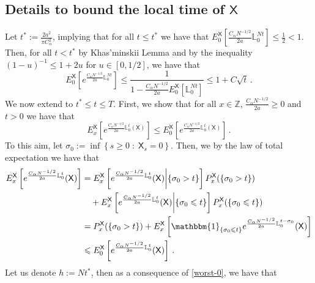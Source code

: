 \documentclass[a4paper,11pt,oneside,reqno]{amsart}
\theoremstyle{definition}
\renewcommand{\leq}{\leqslant}
\renewcommand{\geq}{\geqslant}
\numberwithin{equation}{section}
\begin{document}
{\subsection{Details to bound the local time of $\mathsf{X}$}
Let $t^{*}:= \frac{2a^{2}}{\pi C_{\alpha}^{2}}$, implying that for all $t\leq t^{*}$ we have that $E_{0}^{\mathsf{X}}[\frac{C_{\alpha}N^{-1/2}}{2a}\mathbb{L}_{0}^{Nt}]\leq \frac{1}{2}<1$. Then, for all $t<t^{*}$ by  Khas’minskii Lemma \cite{Khasminskii1959} and by the inequality $(1-u)^{-1}\leq 1+2u$ for $u\in[0,1/2]$, we have that  
\begin{equation*}
	E_{0}^{\mathsf{X}}\left[e^{\frac{C_{\alpha}N^{-1/2}}{2a}\mathbb{L}_{0}^{Nt}}\right]\leq \frac{1}{1-\frac{C_{\alpha}N^{-1/2}}{2a}E_{0}^{\mathsf{X}}[\mathbb{L}_{0}^{Nt}]}\leq  1+C\sqrt{t}\,.
\end{equation*}
We now extend to $t^{*}\leq t\leq T$. First, we show that for all $x\in \mathbb{Z}$, $\frac{C_{\alpha}N^{-1/2}}{2a}\geq 0$ and $t>0$ we have that 
\begin{equation}\label{worst-0}
	E_{x}^{\mathsf{X}}\left[e^{\frac{C_{\alpha}N^{-1/2}}{2a} \mathbb{L}^{t}_{0}(\mathsf{X})}\right]\leq E_{0}^{\mathsf{X}}\left[e^{\frac{C_{\alpha}N^{-1/2}}{2a} \mathbb{L}^{t}_{0}(\mathsf{X})}\right] \,.
\end{equation}
To this aim, let $\sigma_{0}:=\inf\left\{s\geq 0\;:\; \mathsf{X}_{s}=0\right\}$. Then, we by the law of total expectation we have that 
\begin{equation*}
	\begin{split}
		E_{x}^{\mathsf{X}}\left[e^{\frac{C_{\alpha}N^{-1/2}}{2a} \mathbb{L}_{0}^{t}}(\mathsf{X})\right]&= E_{x}^{\mathsf{X}}\left[e^{\frac{C_{\alpha}N^{-1/2}}{2a} \mathbb{L}_{0}^{t}}(\mathsf{X})\bigg|\{\sigma_{0}>t\}\right]P_{x}^{\mathsf{X}}(\{\sigma_{0}>t\})
		\\&\quad+E_{x}^{\mathsf{X}}\left[e^{\frac{C_{\alpha}N^{-1/2}}{2a} \mathbb{L}_{0}^{t}}(\mathsf{X})\bigg|\{\sigma_{0}\leq t\}\right]P_{x}^{\mathsf{X}}(\{\sigma_{0}\leq t\})
		\\&=
		P_{x}^{\mathsf{X}}(\{\sigma_{0}>t\})+E_{x}^{\mathsf{X}}\left[\mathbbm{1}_{\{\sigma_{0}\leq t\}}e^{\frac{C_{\alpha}N^{-1/2}}{2a} \mathbb{L}_{0}^{t-\sigma_{0}}}(\mathsf{X})\right]
		\\&\leq E_{0}^{\mathsf{X}}\left[e^{\frac{C_{\alpha}N^{-1/2}}{2a} \mathbb{L}_{0}^{t}}(\mathsf{X})\right]\,.
	\end{split}
\end{equation*}
Let us denote $h:= N t^{*}$, then as a consequence of \eqref{worst-0}, we have that
}
\end{document}
